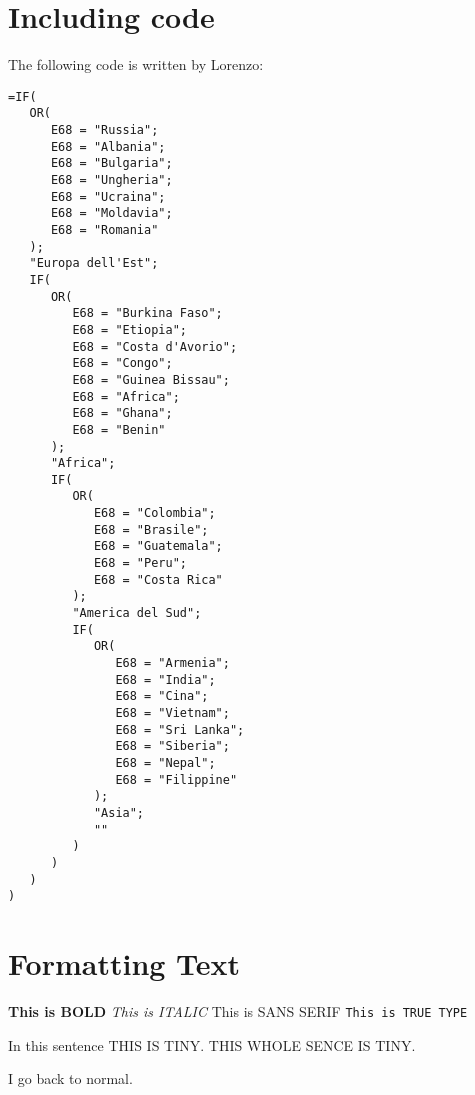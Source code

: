\section{Including code}
The following code is written by Lorenzo:

%			

\begin{minipage}{\linewidth}
\begin{lstlisting}
=IF(
   OR(
      E68 = "Russia";
      E68 = "Albania";
      E68 = "Bulgaria";
      E68 = "Ungheria";
      E68 = "Ucraina";
      E68 = "Moldavia";
      E68 = "Romania"
   );
   "Europa dell'Est";
   IF(
      OR(
         E68 = "Burkina Faso";
         E68 = "Etiopia";
         E68 = "Costa d'Avorio";
         E68 = "Congo";
         E68 = "Guinea Bissau";
         E68 = "Africa";
         E68 = "Ghana";
         E68 = "Benin"
      );
      "Africa";
      IF(
         OR(
            E68 = "Colombia";
            E68 = "Brasile";
            E68 = "Guatemala";
            E68 = "Peru";
            E68 = "Costa Rica"
         );
         "America del Sud";
         IF(
            OR(
               E68 = "Armenia";
               E68 = "India";
               E68 = "Cina";
               E68 = "Vietnam";
               E68 = "Sri Lanka";
               E68 = "Siberia";
               E68 = "Nepal";
               E68 = "Filippine"
            );
            "Asia";
            ""
         )
      )
   )
)
\end{lstlisting}
\end{minipage}

\section{Formatting Text}
\textbf{This is BOLD}
\textit{This is ITALIC}
\textsf{This is SANS SERIF}
\texttt{This is TRUE TYPE}

In this sentence {\tiny{THIS IS TINY}}.
\tiny THIS WHOLE SENCE IS TINY.

\normalsize I go back to normal.

